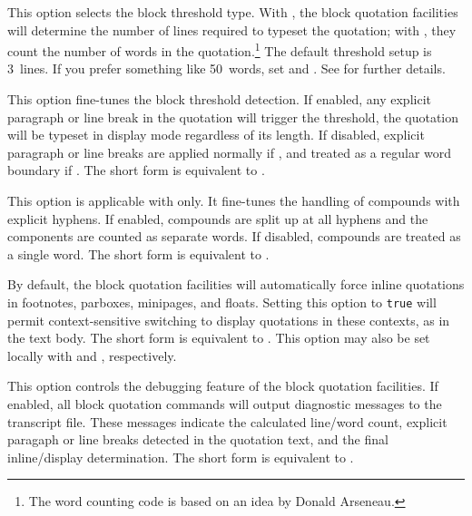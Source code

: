 \documentclass{ltxdockit}[2010/09/26]
\begin{document}
\begin{optionlist}

This option selects the block threshold type. With , the block quotation facilities will determine the number of lines required to typeset the quotation; with , they count the number of words in the quotation.\footnote{The word counting code is based on an idea by Donald Arseneau.} The default threshold setup is 3~lines. If you prefer something like 50~words, set  and . See  for further details.


This option fine-tunes the block threshold detection. If enabled, any explicit paragraph or line break in the quotation will trigger the threshold, \ie the quotation will be typeset in display mode regardless of its length. If disabled, explicit paragraph or line breaks are applied normally if , and treated as a regular word boundary if . The short form  is equivalent to .


This option is applicable with  only. It fine-tunes the handling of compounds with explicit hyphens. If enabled, compounds are split up at all hyphens and the components are counted as separate words. If disabled, compounds are treated as a single word. The short form  is equivalent to .


By default, the block quotation facilities will automatically force inline quotations in footnotes, parboxes, minipages, and floats. Setting this option to \texttt{true} will permit context-sensitive switching to display quotations in these contexts, as in the text body. The short form  is equivalent to . This option may also be set locally with  and , respectively.


This option controls the debugging feature of the block quotation facilities. If enabled, all block quotation commands will output diagnostic messages to the transcript file. These messages indicate the calculated line\slash word count, explicit paragaph or line breaks detected in the quotation text, and the final inline\slash display determination. The short form  is equivalent to .

\end{optionlist}
\end{document}
